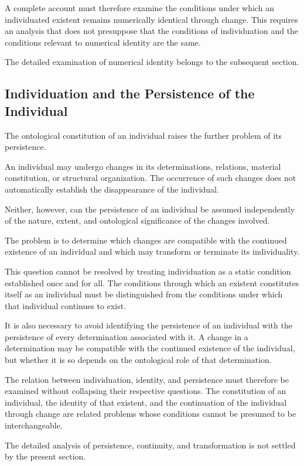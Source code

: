 A complete account must therefore examine the conditions
under which an individuated existent remains numerically
identical through change. This requires an analysis that
does not presuppose that the conditions of individuation
and the conditions relevant to numerical identity are
the same.

The detailed examination of numerical identity belongs
to the subsequent section.

\subsection{Individuation and the Persistence of the Individual}

The ontological constitution of an individual raises
the further problem of its persistence.

An individual may undergo changes in its determinations,
relations, material constitution, or structural organization.
The occurrence of such changes does not automatically
establish the disappearance of the individual.

Neither, however, can the persistence of an individual
be assumed independently of the nature, extent, and
ontological significance of the changes involved.

The problem is to determine which changes are compatible
with the continued existence of an individual and which
may transform or terminate its individuality.

This question cannot be resolved by treating individuation
as a static condition established once and for all.
The conditions through which an existent constitutes
itself as an individual must be distinguished from the
conditions under which that individual continues to exist.

It is also necessary to avoid identifying the persistence
of an individual with the persistence of every determination
associated with it. A change in a determination may be
compatible with the continued existence of the individual,
but whether it is so depends on the ontological role of
that determination.

The relation between individuation, identity, and persistence
must therefore be examined without collapsing their
respective questions. The constitution of an individual,
the identity of that existent, and the continuation of
the individual through change are related problems whose
conditions cannot be presumed to be interchangeable.

The detailed analysis of persistence, continuity, and
transformation is not settled by the present section.

